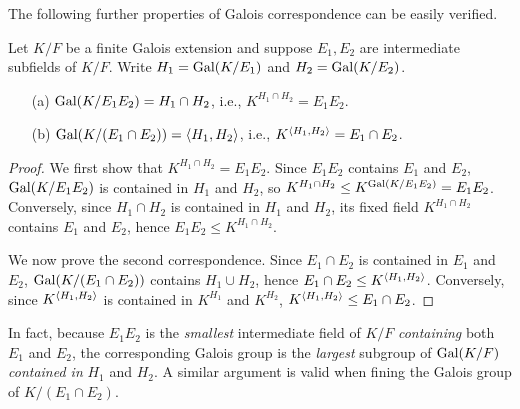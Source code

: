 The following further properties of Galois correspondence can be easily verified.
\begin{thm}\label{Galois'_thm_2}
    Let $K/F$ be a finite Galois extension and suppose $E_1, E_2$ are intermediate subfields of $K/F$.
    Write $H_1={\textrm{Gal}({K/E_1})}$ and $H_2={\textrm{Gal}({K/E_2})}$.
    \begin{enumerate}
        \item[(a)]
        {
            ${\textrm{Gal}({K/E_1E_2})}=H_1\cap H_2$, i.e., $K^{H_1\cap H_2}=E_1E_2$.
        }
        \item[(b)]
        {
            ${\textrm{Gal}({K/(E_1\cap E_2)})}={\left\langle{H_1, H_2}\right\rangle}$, i.e., $K^{{\left\langle{H_1, H_2}\right\rangle}}=E_1\cap E_2$.
        }
    \end{enumerate}
\end{thm}
\begin{proof}
    We first show that $K^{H_1\cap H_2}=E_1E_2$.
    Since $E_1E_2$ contains $E_1$ and $E_2$, ${\textrm{Gal}({K/E_1E_2})}$ is contained in $H_1$ and $H_2$, so $K^{H_1\cap H_2}\leq K^{\textrm{Gal}({K/E_1E_2})}=E_1E_2$.
    Conversely, since $H_1\cap H_2$ is contained in $H_1$ and $H_2$, its fixed field $K^{H_1\cap H_2}$ contains $E_1$ and $E_2$, hence $E_1E_2\leq K^{H_1\cap H_2}$.

    We now prove the second correspondence.
    Since $E_1\cap E_2$ is contained in $E_1$ and $E_2$, ${\textrm{Gal}({K/(E_1\cap E_2)})}$ contains $H_1\cup H_2$, hence $E_1\cap E_2\leq K^{\left\langle{H_1, H_2}\right\rangle}$.
    Conversely, since $K^{\left\langle{H_1, H_2}\right\rangle}$ is contained in $K^{H_1}$ and $K^{H_2}$, $K^{\left\langle{H_1, H_2}\right\rangle}\leq E_1\cap E_2$.
\end{proof}
\begin{rmk}
    In fact, because $E_1E_2$ is the \textit{smallest} intermediate field of $K/F$ \textit{containing} both $E_1$ and $E_2$, the corresponding Galois group is the \textit{largest} subgroup of ${\textrm{Gal}({K/F})}$ \textit{contained in} $H_1$ and $H_2$.
    A similar argument is valid when fining the Galois group of $K/(E_1\cap E_2)$.
\end{rmk}


